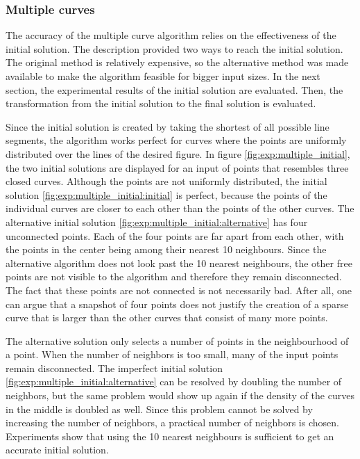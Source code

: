 \documentclass[11pt]{article}
\begin{document}
\subsubsection{Multiple curves}
The accuracy of the multiple curve algorithm relies on the effectiveness of the initial solution. The description provided two ways to reach the initial solution. The original method is relatively expensive, so the alternative method was made available to make the algorithm feasible for bigger input sizes. In the next section, the experimental results of the initial solution are evaluated. Then, the transformation from the initial solution to the final solution is evaluated.

Since the initial solution is created by taking the shortest of all possible line segments, the algorithm works perfect for curves where the points are uniformly distributed over the lines of the desired figure.
In figure \ref{fig:exp:multiple_initial}, the two initial solutions are displayed for an input of points that resembles three closed curves. Although the points are not uniformly distributed, the initial solution \ref{fig:exp:multiple_initial:initial} is perfect, because the points of the individual curves are closer to each other than the points of the other curves.
The alternative initial solution \ref{fig:exp:multiple_initial:alternative} has four unconnected points. Each of the four points are far apart from each other, with the points in the center being among their nearest 10 neighbours. Since the alternative algorithm does not look past the 10 nearest neighbours, the other free points are not visible to the algorithm and therefore they remain disconnected.
The fact that these points are not connected is not necessarily bad. After all, one can argue that a snapshot of four points does not justify the creation of a sparse curve that is larger than the other curves that consist of many more points.

The alternative solution only selects a number of points in the neighbourhood of a point. When the number of neighbors is too small, many of the input points remain disconnected. The imperfect initial solution \ref{fig:exp:multiple_initial:alternative} can be resolved by doubling the number of neighbors, but the same problem would show up again if the density of the curves in the middle is doubled as well. Since this problem cannot be solved by increasing the number of neighbors, a practical number of neighbors is chosen.
Experiments show that using the 10 nearest neighbours is sufficient to get an accurate initial solution.
\end{document}
